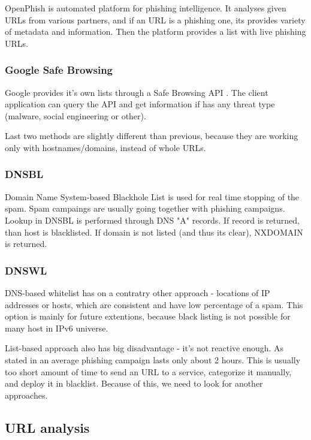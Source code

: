 \documentclass[
  digital, %
  oneside, %
  table,   %
  nolof,     %
  nolot,     %
]{fithesis3}
\begin{document}
OpenPhish \cite{openphish} is automated platform for phishing intelligence. It analyses given URLs from various partners, and if an URL is a phishing one, its provides variety of metadata and information. Then the platform provides a list with live phishing URLs. 

\subsubsection{Google Safe Browsing}
\label{section:google-safe-browsing}

Google provides it's own lists through a Safe Browsing API \cite{google-safe-browsing}. The client application can query the API and get information if has any threat type (malware, social engineering or other).

Last two methods are slightly different than previous, because they are working only with hostnames/domains, instead of whole URLs.

\subsubsection{DNSBL}

Domain Name System-based Blackhole List \cite{wiki:dnsbl} is used for real time stopping of the spam. Spam campaings are usually going together \cite{najdi daku citaciu} with phishing campaigns. Lookup in DNSBL is performed through DNS "A" records. If record is returned, than host is blacklisted. If domain is not listed (and thus its clear), NXDOMAIN is returned.

\subsubsection{DNSWL}

DNS-based whitelist \cite{wiki:dnswl} has on a contratry other approach - locations of IP addresses or hosts, which are consistent and have low percentage of a spam. This option is mainly for future extentions, because black listing is not possible for many host in IPv6 universe.

List-based approach also has big disadvantage - it's not reactive enough. As stated in \cite{najdi pojebanu citaciu kde si to cital} an average phishing campaign lasts only about 2 hours. This is usually too short amount of time to send an URL to a service, categorize it manually, and deploy it in blacklist. Because of this, we need to look for another approaches. 

\subsection{URL analysis}
\end{document}
